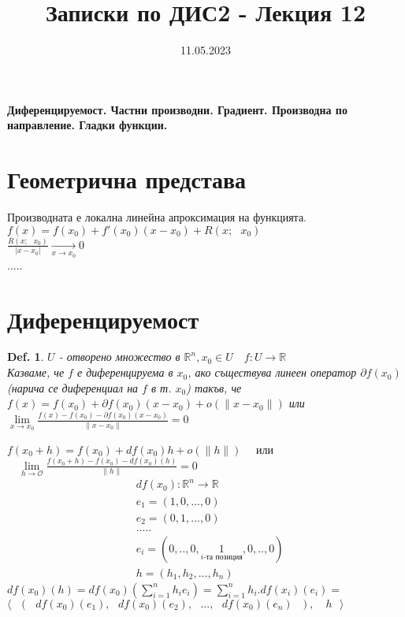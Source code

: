\documentclass[12pt]{article}
\newtheorem{definition}{Def.}
\newcommand{\spc}{\text{ }}
\begin{document}
	\color{white}
	\pagecolor{darkgray}
	\title{Записки по ДИС2 - Лекция 12}
	\date{11.05.2023}
	\maketitle
	\begin{center}
		\Large
		\textbf{Диференцируемост. Частни производни. Градиент. Производна по направление. Гладки функции.}
	\end{center}
	
	
	\section*{Геометрична представа}
	Производната е локална линейна апроксимация на функцията.\\
	$f(x) = f(x_0)+f'(x_0)(x-x_0)+R(x;\spc x_0)$\\
	$\frac{R(x;\spc x_0)}{|x-x_0|}\underset{x\to x_0}{\longrightarrow}0$\\
	$\spc$\\
	.....\\
	
	\section*{Диференцируемост}
	\begin{definition}
		$U$ - отворено множество в $\mathbb{R}^n, x_0\in U\quad f:U\rightarrow\mathbb{R}$\\
		Казваме, че $f$ е диференцируема в $x_0$, ако съществува линеен оператор $\partial f(x_0)$ (нарича се диференциал на $f$ в т. $x_0$) такъв, че \\
		$f(x)=f(x_0)+\partial f(x_0)(x-x_0)+o(\|x-x_0\|)$ или\\
		$\lim\limits_{x\to x_0}\frac{f(x)-f(x_0)-\partial f(x_0)(x-x_0)}{\|x-x_0\|}=0$
	\end{definition}
	$f(x_0 +h) = f(x_0) + df(x_0)h + o(\|h\|)\quad$ или 
	$\quad\lim\limits_{h\to\mathcal{O}}\frac{f(x_0 +h) - f(x_0) - df(x_0)(h)}{\|h\|} = 0$\\
	
	\begin{align*}
		&df(x_0) : \mathbb{R}^n \rightarrow \mathbb{R}\\
		&e_1 = (1,0,...,0)\\
		&e_2 = (0,1,...,0)\\
		&	.....\\
		&e_i = (0,..,0,\underset{i\text{-та позиция}}{1},0,..,0)\\
		&h = (h_1,h_2,...,h_n)
	\end{align*}
	$df(x_0)(h)=df(x_0)\left(\sum_{i=1}^{n}h_i e_i\right) = \sum_{i=1}^{n}h_i . df(x_i)(e_i) = $
	$\big\langle \spc (\spc df(x_0)(e_1),\spc df(x_0)(e_2),\spc...,\spc df(x_0)(e_n)\spc),\quad h\spc\big\rangle$
	
\end{document}
